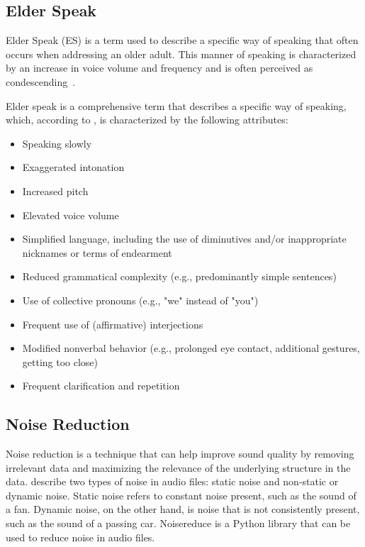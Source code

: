 \documentclass[english]{hogent-article}
\begin{document}
\subsection{Elder Speak}
Elder Speak (ES) is a term used to describe a specific way of speaking that often occurs when addressing an older adult. This manner of speaking is characterized by an increase in voice volume and frequency and is often perceived as condescending~\autocite{SteveBalsis2006}.

Elder speak is a comprehensive term that describes a specific way of speaking, which, according to \cite{Campens2021}, is characterized by the following attributes:

\begin{itemize}
    \item Speaking slowly
    \item Exaggerated intonation
    \item Increased pitch
    \item Elevated voice volume
    \item Simplified language, including the use of diminutives and/or inappropriate nicknames or terms of endearment
    \item Reduced grammatical complexity (e.g., predominantly simple sentences)
    \item Use of collective pronouns (e.g., "we" instead of "you")
    \item Frequent use of (affirmative) interjections
    \item Modified nonverbal behavior (e.g., prolonged eye contact, additional gestures, getting too close)
    \item Frequent clarification and repetition
\end{itemize}

\subsection{Noise Reduction}
Noise reduction is a technique that can help improve sound quality by removing irrelevant data and maximizing the relevance of the underlying structure in the data.
\cite{Sainburg_2021} describe two types of noise in audio files: static noise and non-static or dynamic noise.
Static noise refers to constant noise present, such as the sound of a fan.
Dynamic noise, on the other hand, is noise that is not consistently present, such as the sound of a passing car.
Noisereduce \autocite{Sainburg2022} is a Python library that can be used to reduce noise in audio files.
\end{document}
